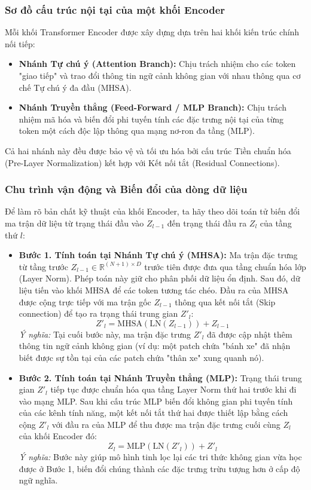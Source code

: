 \subsubsection{Sơ đồ cấu trúc nội tại của một khối Encoder}
Mỗi khối Transformer Encoder được xây dựng dựa trên hai khối kiến trúc chính nối tiếp:
\begin{itemize}
    \item \textbf{Nhánh Tự chú ý (Attention Branch):} Chịu trách nhiệm cho các token "giao tiếp" và trao đổi thông tin ngữ cảnh không gian với nhau thông qua cơ chế Tự chú ý đa đầu (MHSA).
    \item \textbf{Nhánh Truyền thẳng (Feed-Forward / MLP Branch):} Chịu trách nhiệm mã hóa và biến đổi phi tuyến tính các đặc trưng nội tại của từng token một cách độc lập thông qua mạng nơ-ron đa tầng (MLP).
\end{itemize}

Cả hai nhánh này đều được bảo vệ và tối ưu hóa bởi cấu trúc Tiền chuẩn hóa (Pre-Layer Normalization) kết hợp với Kết nối tắt (Residual Connections).

\subsubsection{Chu trình vận động và Biến đổi của dòng dữ liệu}
Để làm rõ bản chất kỹ thuật của khối Encoder, ta hãy theo dõi toán tử biến đổi ma trận dữ liệu từ trạng thái đầu vào $Z_{l-1}$ đến trạng thái đầu ra $Z_l$ của tầng thứ $l$:

\begin{itemize}
    \item \textbf{Bước 1. Tính toán tại Nhánh Tự chú ý (MHSA):} Ma trận đặc trưng từ tầng trước $Z_{l-1} \in \mathbb{R}^{(N+1) \times D}$ trước tiên được đưa qua tầng chuẩn hóa lớp (Layer Norm). Phép toán này giữ cho phân phối dữ liệu ổn định. Sau đó, dữ liệu tiến vào khối MHSA để các token tương tác chéo. Đầu ra của MHSA được cộng trực tiếp với ma trận gốc $Z_{l-1}$ thông qua kết nối tắt (Skip connection) để tạo ra trạng thái trung gian $Z'_l$: $$Z'_l = \text{MHSA}(\text{LN}(Z_{l-1})) + Z_{l-1}$$
    \textit{Ý nghĩa:} Tại cuối bước này, ma trận đặc trưng $Z'_l$ đã được cập nhật thêm thông tin ngữ cảnh không gian (ví dụ: một patch chứa "bánh xe" đã nhận biết được sự tồn tại của các patch chứa "thân xe" xung quanh nó).
    \item \textbf{Bước 2. Tính toán tại Nhánh Truyền thẳng (MLP):} Trạng thái trung gian $Z'_l$ tiếp tục được chuẩn hóa qua tầng Layer Norm thứ hai trước khi đi vào mạng MLP. Sau khi cấu trúc MLP biến đổi không gian phi tuyến tính của các kênh tính năng, một kết nối tắt thứ hai được thiết lập bằng cách cộng $Z'_l$ với đầu ra của MLP để thu được ma trận đặc trưng cuối cùng $Z_l$ của khối Encoder đó:$$Z_l = \text{MLP}(\text{LN}(Z'_l)) + Z'_l$$
    \textit{Ý nghĩa:} Bước này giúp mô hình tinh lọc lại các tri thức không gian vừa học được ở Bước 1, biến đổi chúng thành các đặc trưng trừu tượng hơn ở cấp độ ngữ nghĩa.
\end{itemize}

